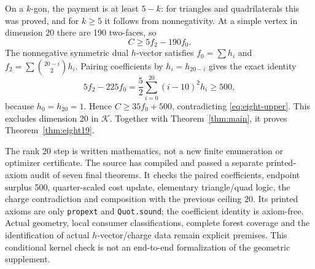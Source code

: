 On a $k$-gon, the payment is at least $5-k$: for triangles and
quadrilaterals this was proved, and for $k\ge5$ it follows from
nonnegativity. At a simple vertex in dimension 20 there are 190 two-faces, so
\[
 C\ge5f_2-190f_0.
\]
The nonnegative symmetric dual $h$-vector satisfies
$f_0=\sum h_i$ and $f_2=\sum\binom{20-i}{2}h_i$.
Pairing coefficients by $h_i=h_{20-i}$ gives the exact identity
\begin{equation}\label{eq:eight-gap}
 5f_2-225f_0
 =\frac52\sum_{i=0}^{20}(i-10)^2 h_i\ge500,
\end{equation}
because $h_0=h_{20}=1$. Hence $C\ge35f_0+500$, contradicting
\eqref{eq:eight-upper}. This excludes dimension 20 in $\mathcal K$.
Together with Theorem~\ref{thm:main}, it proves
Theorem~\ref{thm:eight19}.

The rank 20 step is written mathematics, not a new finite enumeration
or optimizer certificate. The source
 has compiled
and passed a separate printed-axiom audit of seven final theorems.
It checks the paired coefficients, endpoint surplus 500, quarter-scaled
cost update, elementary triangle/quad logic, the charge contradiction
and composition with the previous ceiling 20. Its printed axioms are
only \texttt{propext} and \texttt{Quot.sound}; the coefficient identity
is axiom-free. Actual geometry, local consumer classifications, complete
forest coverage and the identification of actual $h$-vector/charge data
remain explicit premises. This conditional kernel check is not an
end-to-end formalization of the geometric supplement.

